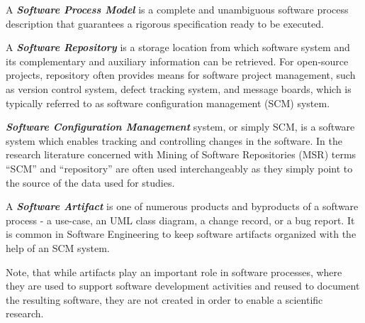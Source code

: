 
\begin{defn}\label{def_process_model}
A \textbf{\textit{Software Process Model}} is a complete and unambiguous software process description 
that guarantees a rigorous specification ready to be executed.
\end{defn}

\begin{defn}\label{def_repository}
A \textbf{\textit{Software Repository}} is a storage location from which software system and its complementary 
and auxiliary information can be retrieved. For open-source projects, repository often provides means for software
project management, such as version control system, defect tracking system, and message boards, which is 
typically referred to as software configuration management (SCM) system.
\end{defn}

\begin{defn}\label{scm_system}
\textbf{\textit{Software Configuration Management}} system, or simply SCM, is a software system which enables
tracking and controlling changes in the software. In the research literature concerned with Mining of Software 
Repositories (MSR) terms ``SCM'' and ``repository'' are often used interchangeably as they simply point to the 
source of the data used for studies. 
\end{defn}

\begin{defn}\label{def_artifact}
A \textbf{\textit{Software Artifact}} is one of numerous products and byproducts of a software process - 
a use-case, an UML class diagram, a change record, or a bug report. It is common in Software Engineering
to keep software artifacts organized with the help of an SCM system.
\end{defn}
Note, that while artifacts play an important role in software processes, where they are used to support 
software development activities and reused to document the resulting software, they are not created 
in order to enable a scientific research.

